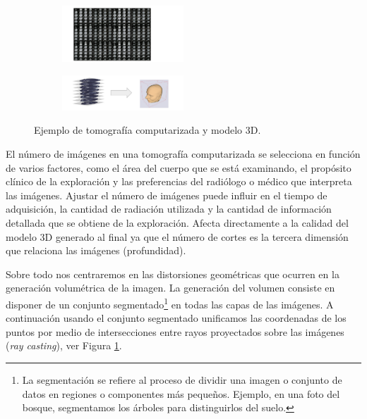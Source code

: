 \begin{figure}[htp]
  \begin{subfigure}{2\textwidth}
  \hspace{1cm}\includegraphics[width=0.5\textwidth]{imagenes/chapter2/CTDir.png}
  \end{subfigure}
  \begin{subfigure}{2\textwidth}
  \includegraphics[width=0.5\textwidth]{imagenes/chapter2/CT2Volume.png}
  \end{subfigure}
  \caption{Ejemplo de tomografía computarizada y modelo 3D\cite{CT2Volume}.}
  \label{fig:CT2Volume}
\end{figure}

El número de imágenes en una tomografía computarizada se selecciona en función 
de varios factores, como el área del cuerpo que se está examinando, el propósito 
clínico de la exploración y las preferencias del radiólogo o médico que interpreta 
las imágenes. Ajustar el número de imágenes puede influir en el tiempo de adquisición, 
la cantidad de radiación utilizada y la cantidad de información detallada que se 
obtiene de la exploración. Afecta directamente a la calidad del modelo 3D generado 
al final ya que el número de cortes es la tercera dimensión que relaciona las imágenes 
(profundidad).


Sobre todo nos centraremos en las distorsiones geométricas que ocurren en la 
generación volumétrica de la imagen. La generación del volumen consiste en 
disponer de un conjunto segmentado\footnote{
La segmentación se refiere al proceso de dividir una imagen o conjunto de datos en regiones o componentes más pequeños. 
Ejemplo, en una foto del bosque, segmentamos los árboles para distinguirlos del suelo.
} en todas las capas de las imágenes. A continuación usando el conjunto segmentado 
unificamos las coordenadas de los puntos por medio de intersecciones entre rayos 
proyectados sobre las imágenes (\emph{ray casting}), ver Figura \ref{fig:CT2Volume}.

